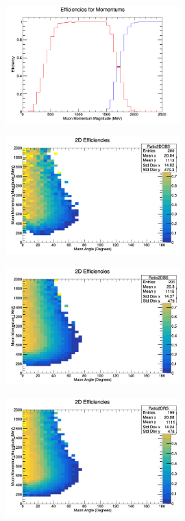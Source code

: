 \documentclass[11pt]{article}
\begin{document}
\begin{figure}[H]
\centering
\includegraphics[width=0.6\textwidth]{NMCombinedPlotsImages/6-NMCombinedPlots.png}
\caption{}
\end{figure}

\begin{figure}[H]
\centering
\includegraphics[width=0.6\textwidth]{NMCombinedPlotsImages/7-NMCombinedPlots.png}
\caption{}
\end{figure}

\begin{figure}[H]
\centering
\includegraphics[width=0.6\textwidth]{NMCombinedPlotsImages/8-NMCombinedPlots.png}
\caption{}
\end{figure}

\begin{figure}[H]
\centering
\includegraphics[width=0.6\textwidth]{NMCombinedPlotsImages/9-NMCombinedPlots.png}
\caption{}
\end{figure}
\end{document}
